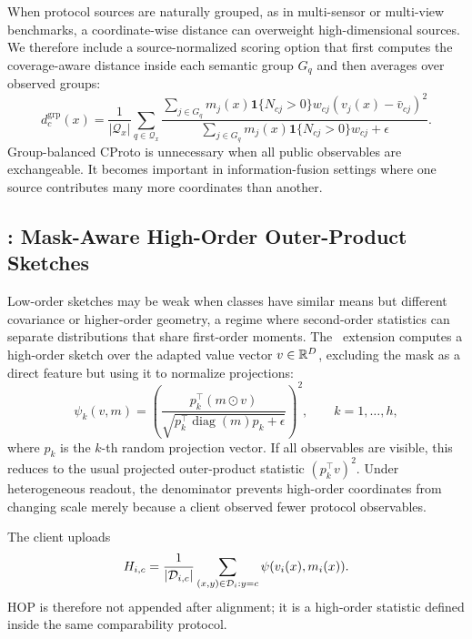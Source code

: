 When protocol sources are naturally grouped, as in multi-sensor or multi-view benchmarks, a coordinate-wise distance can overweight high-dimensional sources. We therefore include a source-normalized scoring option that first computes the coverage-aware distance inside each semantic group \(G_q\) and then averages over observed groups:
\begin{equation}
    d_c^{\mathrm{grp}}(x)=
    \frac{1}{|\mathcal{Q}_x|}
    \sum_{q\in\mathcal{Q}_x}
    \frac{\sum_{j\in G_q} m_j(x)\mathbf{1}\{N_{cj}>0\}w_{cj}(v_j(x)-\bar v_{cj})^2}
    {\sum_{j\in G_q} m_j(x)\mathbf{1}\{N_{cj}>0\}w_{cj}+\epsilon}.
\end{equation}
Group-balanced CProto is unnecessary when all public observables are exchangeable. It becomes important in information-fusion settings where one source contributes many more coordinates than another.

\subsection{\hopmethod: Mask-Aware High-Order Outer-Product Sketches}

Low-order sketches may be weak when classes have similar means but different covariance or higher-order geometry, a regime where second-order statistics can separate distributions that share first-order moments. The \hopmethod\ extension computes a high-order sketch over the adapted value vector \(v\in\mathbb{R}^D\), excluding the mask as a direct feature but using it to normalize projections:
\begin{equation}
    \psi_k(v,m)=
    \left(
    \frac{p_k^\top(m\odot v)}
    {\sqrt{p_k^\top \operatorname{diag}(m)p_k+\epsilon}}
    \right)^2,
    \qquad k=1,\ldots,h,
\end{equation}
where \(p_k\) is the \(k\)-th random projection vector. If all observables are visible, this reduces to the usual projected outer-product statistic \((p_k^\top v)^2\). Under heterogeneous readout, the denominator prevents high-order coordinates from changing scale merely because a client observed fewer protocol observables.

The client uploads
\begin{equation}
    H_{i,c} =
    \frac{1}{|\mathcal{D}_{i,c}|}\sum_{(x,y)\in\mathcal{D}_i:y=c}\psi(v_i(x),m_i(x)).
\end{equation}
HOP is therefore not appended after alignment; it is a high-order statistic defined inside the same comparability protocol.

